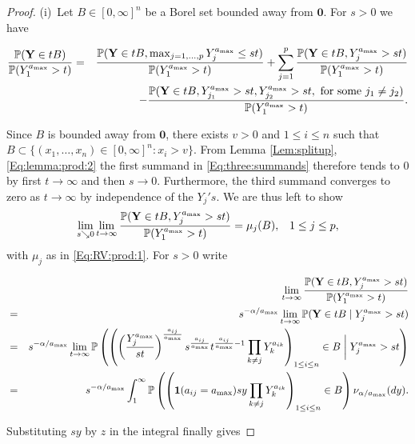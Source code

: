 \begin{proof}%
(i)~Let $B \in [0,\infty]^n$ be a Borel set bounded away from $\mathbf{0}$. For $s>0$ we have
\begin{small}
\begin{eqnarray}
  \label{Eq:three:summands}  \frac{\P(\mathbf{Y} \in tB)}{\P(Y_1^{a_{\max}}>t)} &=&  \frac{\P(\mathbf{Y} \in tB, \max_{j=1, \ldots, p}Y_j^{a_{\max}}\leq st)}{\P(Y_1^{a_{\max}}>t)}
  + \sum_{j=1}^p  \frac{\P(\mathbf{Y} \in tB, Y_j^{a_{\max}}>st)}{\P(Y_1^{a_{\max}}>t)} \nonumber\\
  && - \frac{\P(\mathbf{Y} \in tB, Y_{j_1}^{a_{\max}}>st, Y_{j_2}^{a_{\max}}>st, \mbox{ for some } j_1 \neq j_2)}{\P(Y_1^{a_{\max}}>t)}.
\end{eqnarray}
\end{small}
Since $B$ is bounded away from $\mathbf{0}$, there exists $v>0$ and $1 \leq i \leq n$ such that $B \subset \{(x_1, \ldots, x_n) \in [0,\infty]^n: x_i>v\}$. From Lemma \ref{Lem:splitup}, \eqref{Eq:lemma:prod:2} the first summand in \eqref{Eq:three:summands} therefore tends to 0 by first $t \to \infty$ and then $s \to 0$. Furthermore, the third summand converges to zero as $t \to \infty$ by independence of the $Y_j's$. We are thus left to show
$$ \lim_{s \searrow 0}\lim_{t \to \infty} \frac{\P(\mathbf{Y} \in tB, Y_j^{a_{\max}}>st)}{\P(Y_1^{a_{\max}}>t)}=\mu_j(B), \;\;\; 1 \leq j \leq p, $$
with $\mu_j$ as in \eqref{Eq:RV:prod:1}. For $s>0$ write
\begin{small}
  \begin{eqnarray*}
    &&
    \lim_{t \to \infty}\frac{\P(\mathbf{Y} \in tB, Y_j^{a_{\max}}>st)}{\P(Y_1^{a_{\max}}>t)}\\
    &=& s^{-\alpha/{a_{\max}}} \lim_{t\to \infty} \P(\mathbf{Y} \in tB \mid Y_j^{a_{\max}}>st) \\
    &=& s^{-\alpha/{a_{\max}}} \lim_{t \to \infty} \P\left(\left(\left(\frac{Y_j^{a_{\max}}}{st}\right)^{\frac{a_{ij}}{a_{\max}}}s^{\frac{a_{ij}}{a_{\max}}}t^{\frac{a_{ij}}{a_{\max}}-1}\prod_{k\neq j} Y_k^{a_{ik}}\right)_{1\leq i \leq n} \in B \; \bigg| \; Y_j^{a_{\max}}>st \right)\\
    &=& s^{-\alpha/{a_{\max}}} \int_1^\infty \P\left(\left(\I(a_{ij}=a_{\max})sy\prod_{k \neq j}Y_k^{a_{ik}}\right)_{1 \leq i \leq n} \in B\right)\nu_{\alpha/a_{\max}}(dy).
  \end{eqnarray*}
\end{small}
Substituting $sy$ by $z$ in the integral finally gives

\end{proof}
